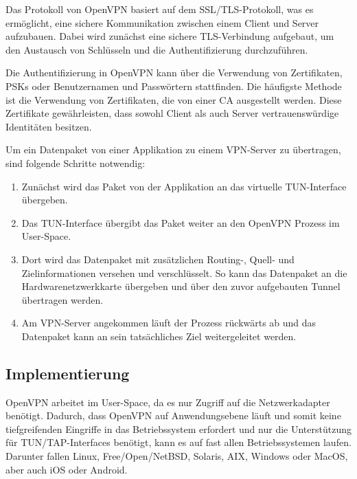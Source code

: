 Das Protokoll von OpenVPN basiert auf dem SSL/TLS-Protokoll, was es ermöglicht, eine sichere Kommunikation zwischen einem Client und Server aufzubauen. Dabei wird zunächst eine sichere TLS-Verbindung aufgebaut, um den Austausch von Schlüsseln und die Authentifizierung durchzuführen. 

Die Authentifizierung in OpenVPN kann über die Verwendung von Zertifikaten, \gls{PSKs} oder Benutzernamen und Passwörtern stattfinden. Die häufigste Methode ist die Verwendung von Zertifikaten, die von einer \gls{CA} ausgestellt werden. Diese Zertifikate gewährleisten, dass sowohl Client als auch Server vertrauenswürdige Identitäten besitzen.

Um ein Datenpaket von einer Applikation zu einem \gls{VPN}-Server zu übertragen, sind folgende Schritte notwendig:

\begin{enumerate}
    \item Zunächst wird das Paket von der Applikation an das virtuelle TUN-Interface übergeben.
    \item Das TUN-Interface übergibt das Paket weiter an den OpenVPN Prozess im User-Space.
    \item Dort wird das Datenpaket mit zusätzlichen Routing-, Quell- und Zielinformationen versehen und verschlüsselt. So kann das Datenpaket an die Hardwarenetzwerkkarte übergeben und über den zuvor aufgebauten Tunnel übertragen werden.
    \item Am \gls{VPN}-Server angekommen läuft der Prozess rückwärts ab und das Datenpaket kann an sein tatsächliches Ziel weitergeleitet werden.
\end{enumerate}

\subsection{Implementierung}
OpenVPN arbeitet im User-Space, da es nur Zugriff auf die Netzwerkadapter benötigt. Dadurch, dass OpenVPN auf Anwendungsebene läuft und somit keine tiefgreifenden Eingriffe in das Betriebssystem erfordert und nur die Unterstützung für TUN/TAP-Interfaces benötigt, kann es auf fast allen Betriebssystemen laufen. Darunter fallen Linux, Free/Open/NetBSD, Solaris, AIX, Windows oder MacOS, aber auch iOS oder Android.